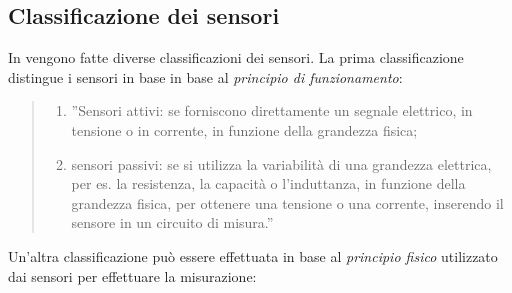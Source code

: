 \documentclass[a4paper]{report} %
\begin{document}
\subsection{Classificazione dei sensori}
In \cite{art:rif.1} vengono fatte diverse classificazioni dei sensori. La prima classificazione distingue i sensori in base in base al \textit{principio di funzionamento}:
\begin{quote}
	\begin{enumerate}
	\item ''Sensori attivi: se forniscono direttamente un segnale elettrico, in tensione o in corrente, in funzione della grandezza fisica;
	\item sensori passivi: se si utilizza la variabilità di una grandezza elettrica, per es. la resistenza, la capacità o l'induttanza, in funzione della grandezza fisica, per ottenere una tensione o una corrente, inserendo il sensore in un circuito di misura.''    
	\end{enumerate}
\end{quote}
Un'altra classificazione può essere effettuata in base al \textit{principio fisico} utilizzato dai sensori per effettuare la misurazione:
\end{document}
